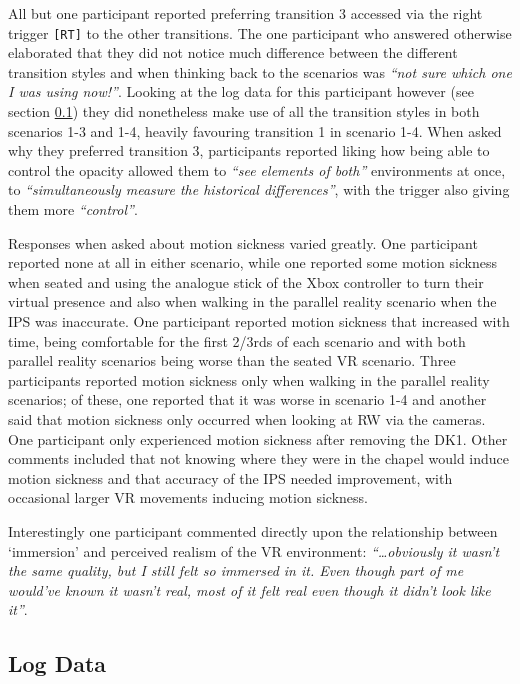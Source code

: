 All but one participant reported preferring transition 3 accessed via the right trigger \texttt{[RT]} to the other transitions. The one participant who answered otherwise elaborated that they did not notice much difference between the different transition styles and when thinking back to the scenarios was \textit{``not sure which one I was using now!''}. Looking at the log data for this participant however (see section \ref{2-1-log-data}) they did nonetheless make use of all the transition styles in both scenarios 1-3 and 1-4, heavily favouring transition 1 in scenario 1-4. When asked why they preferred transition 3, participants reported liking how being able to control the opacity allowed them to \textit{``see elements of both''} environments at once, to \textit{``simultaneously measure the historical differences''}, with the trigger also giving them more \textit{``control''}.

Responses when asked about motion sickness varied greatly. One participant reported none at all in either scenario, while one reported some motion sickness when seated and using the analogue stick of the Xbox controller to turn their virtual presence and also when walking in the parallel reality scenario when the IPS was inaccurate. One participant reported motion sickness that increased with time, being comfortable for the first 2/3rds of each scenario and with both parallel reality scenarios being worse than the seated VR scenario. Three participants reported motion sickness only when walking in the parallel reality scenarios; of these, one reported that it was worse in scenario 1-4 and another said that motion sickness only occurred when looking at RW via the cameras. One participant only experienced motion sickness after removing the DK1. Other comments included that not knowing where they were in the chapel would induce motion sickness and that accuracy of the IPS needed improvement, with occasional larger VR movements inducing motion sickness.

Interestingly one participant commented directly upon the relationship between `immersion' and perceived realism of the VR environment: \textit{``\ldots obviously it wasn't the same quality, but I still felt so immersed in it. Even though part of me would've known it wasn't real, most of it felt real even though it didn't look like it''}.


\subsection{Log Data}
\label{2-1-log-data}

